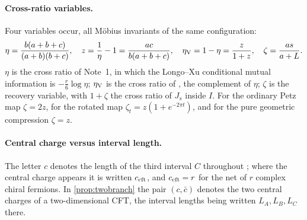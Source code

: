 \paragraph{Cross-ratio variables.}
Four variables occur, all M\"obius invariants of the same configuration:
\begin{equation}\label{eq:variables}
 \eta=\frac{b(a+b+c)}{(a+b)(b+c)},\quad
 z=\frac1\eta-1=\frac{ac}{b(a+b+c)},\quad
 \eta_{\rm V}=1-\eta=\frac z{1+z},\quad
 \zeta=\frac{as}{a+L} .
\end{equation}
$\eta$ is the cross ratio of Note~1, in which the Longo--Xu conditional mutual
information is $-\frac r6\log\eta$; $\eta_{\rm V}$ is the cross ratio of
\cite{VWZ}, the complement of $\eta$; $\zeta$ is the recovery variable, with
$1+\zeta$ the cross ratio of $J_s$ inside $I$.  For the ordinary Petz map
$\zeta=2z$, for the rotated map $\zeta_t=z(1+e^{-2\pi t})$, and for the pure
geometric compression $\zeta=z$.

\paragraph{Central charge versus interval length.}
The letter $c$ denotes the length of the third interval $C$ throughout
; where the central charge appears it is written
$c_{\rm cft}$, and $c_{\rm cft}=r$ for the net of $r$ complex chiral fermions.  In
\cref{prop:twobranch} the pair $(c,\bar c)$ denotes the two central charges of a
two-dimensional CFT, the interval lengths being written $L_A,L_B,L_C$ there.
